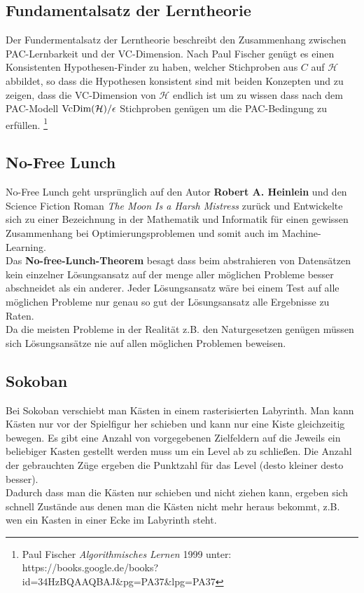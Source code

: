 \documentclass[a4paper]{article}
\begin{document}
\subsection{Fundamentalsatz der Lerntheorie}
Der Fundermentalsatz der Lerntheorie beschreibt den Zusammenhang zwischen PAC-Lernbarkeit und der VC-Dimension. Nach Paul Fischer genügt es einen Konsistenten Hypothesen-Finder zu haben, welcher Stichproben aus $C$ auf $\mathcal{H}$ abbildet, so dass die Hypothesen konsistent sind mit beiden Konzepten und zu zeigen, dass die VC-Dimension von $\mathcal{H}$ endlich ist um zu wissen dass nach dem PAC-Modell $\textnormal{VcDim}(\mathcal{H})/\epsilon$ Stichproben genügen um die PAC-Bedingung zu erfüllen. \footnote{Paul Fischer \textit{Algorithmisches Lernen} 1999 unter: https://books.google.de/books?id=34HzBQAAQBAJ\&pg=PA37\&lpg=PA37
}

\subsection{No-Free Lunch}
No-Free Lunch geht ursprünglich auf den Autor \textbf{ Robert A. Heinlein} und den Science Fiction Roman \textit{The Moon Is a Harsh Mistress } zurück und Entwickelte sich zu einer Bezeichnung in der Mathematik und Informatik für einen gewissen Zusammenhang bei Optimierungsproblemen und somit auch im Machine-Learning. \\
Das \textbf{No-free-Lunch-Theorem} besagt dass beim abstrahieren von Datensätzen kein einzelner Lösungsansatz auf der menge aller möglichen Probleme besser abschneidet als ein anderer. Jeder Lösungsansatz wäre bei einem Test auf alle möglichen Probleme nur genau so gut der Lösungsansatz alle Ergebnisse zu Raten.\\
Da die meisten Probleme in der Realität z.B. den Naturgesetzen genügen müssen sich Lösungsansätze nie auf allen möglichen Problemen beweisen.

\subsection{Sokoban}
Bei Sokoban verschiebt man Kästen in einem rasterisierten  Labyrinth. Man kann Kästen nur vor der Spielfigur her schieben und kann nur eine Kiste gleichzeitig bewegen. Es gibt eine Anzahl von vorgegebenen Zielfeldern auf die Jeweils ein beliebiger Kasten gestellt werden muss um ein Level ab zu schließen. Die Anzahl der gebrauchten Züge ergeben die Punktzahl für das Level (desto kleiner desto besser). \\
Dadurch dass man die Kästen nur schieben und nicht ziehen kann, ergeben sich schnell Zustände aus denen man die Kästen nicht mehr heraus bekommt, z.B. wen ein Kasten in einer Ecke im Labyrinth steht.
\end{document}
